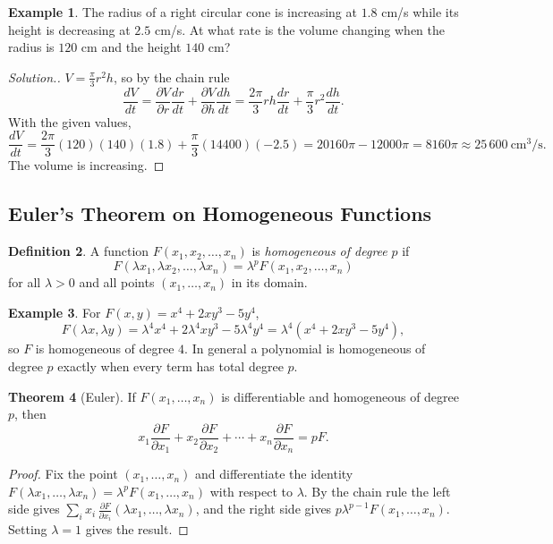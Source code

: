 \documentclass[11pt,a4paper]{article}
\theoremstyle{definition}
\newtheorem{thm}{Theorem}[subsection]
\newtheorem{defn}[thm]{Definition}
\newtheorem{exa}[thm]{Example}
\newenvironment{solution}
  {\renewcommand{\qedsymbol}{}\begin{proof}[\textit{Solution}.]}
  {\end{proof}}
\begin{document}
\begin{exa}
\label{ex:chainrate}
The radius of a right circular cone is increasing at $1.8$ cm/s while its height
is decreasing at $2.5$ cm/s. At what rate is the volume changing when the radius
is $120$ cm and the height $140$ cm?
\end{exa}

\begin{solution}
$V = \frac{\pi}{3}r^2h$, so by the chain rule
\[\frac{dV}{dt} = \frac{\partial V}{\partial r}\frac{dr}{dt} + \frac{\partial
V}{\partial h}\frac{dh}{dt} = \frac{2\pi}{3}rh\frac{dr}{dt} +
\frac{\pi}{3}r^2\frac{dh}{dt}.\]
With the given values,
\[\frac{dV}{dt} = \frac{2\pi}{3}(120)(140)(1.8) + \frac{\pi}{3}(14400)(-2.5) =
20160\pi - 12000\pi = 8160\pi\approx 25\,600\ \text{cm}^3/\text{s}.\]
The volume is increasing.
\end{solution}

{\color[wave]{485}\subsection{Euler's Theorem on Homogeneous Functions}}

\begin{defn}
\label{defn:homogeneous}
A function $F(x_1,x_2,\dots, x_n)$ is \emph{homogeneous of degree} $p$ if
\[F(\lambda x_1,\lambda x_2,\dots, \lambda x_n) = \lambda^p F(x_1,x_2,\dots,x_n)\]
for all $\lambda>0$ and all points $(x_1,\dots,x_n)$ in its domain.
\end{defn}

\begin{exa}
\label{ex:homog}
For $F(x,y) = x^4 + 2xy^3 - 5y^4$,
\[F(\lambda x, \lambda y) = \lambda^4 x^4 + 2\lambda^4xy^3 - 5\lambda^4 y^4 =
\lambda^4 (x^4 +2xy^3 - 5y^4),\]
so $F$ is homogeneous of degree $4$. In general a polynomial is homogeneous of
degree $p$ exactly when every term has total degree $p$.
\end{exa}

\begin{thm}[Euler]
\label{thm:euler}
If $F(x_1,\dots, x_n)$ is differentiable and homogeneous of degree $p$, then
\[ x_1 \frac{\partial F}{\partial x_1} + x_2 \frac{\partial F}{\partial x_2} +
\cdots +x_n \frac{\partial F}{\partial x_n} = p F .\]
\end{thm}

\begin{proof}
Fix the point $(x_1,\dots,x_n)$ and differentiate the identity
$F(\lambda x_1,\dots,\lambda x_n) = \lambda^p F(x_1,\dots,x_n)$ with respect to
$\lambda$. By the chain rule the left side gives
$\sum_i x_i\,\frac{\partial F}{\partial x_i}(\lambda x_1,\dots,\lambda x_n)$,
and the right side gives $p\lambda^{p-1}F(x_1,\dots,x_n)$. Setting $\lambda = 1$
gives the result.
\end{proof}
\end{document}
